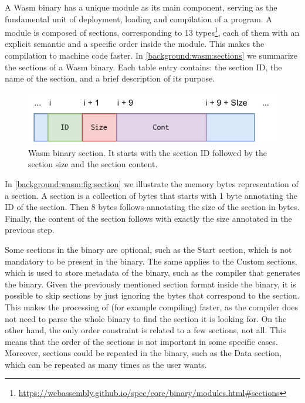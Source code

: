 A Wasm binary has a unique module as its main component, serving as the fundamental unit of deployment, loading and compilation of a \Wasm program.
A module is composed of sections, corresponding to 13 types\footnote{\url{https://webassembly.github.io/spec/core/binary/modules.html\#sections}}, each of them with an explicit semantic and a specific order inside the module. 
This makes the compilation to machine code faster. 
In \autoref{background:wasm:sections} we summarize the sections of a Wasm  binary.
Each table entry contains: the section ID, the name of the section, and a brief description of its purpose. 

\begin{figure}
    \centering
    \includegraphics[width=0.5\linewidth]{figures/section.pdf}
    \caption{Wasm binary section. It starts with the section ID followed by the section size and the section content.}
    \label{background:wasm:fig:section}
\end{figure}

In \autoref{background:wasm:fig:section} we illustrate the memory bytes representation of a \wasm section.
A \wasm section is a collection of bytes that starts with 1 byte annotating the ID of the section. 
Then 8 bytes follows annotating the size of the section in bytes. 
Finally, the content of the section follows with exactly the size annotated in the previous step.  

Some sections in the binary are optional, such as the Start section, which is not mandatory to be present in the binary.
The same applies to the Custom sections, which is used to store metadata of the binary, such as the compiler that generates the binary.
Given the previously mentioned section format inside the binary, it is possible to skip sections by just ignoring the bytes that correspond to the section.
This makes the processing of \wasm (for example compiling) faster, as the compiler does not need to parse the whole binary to find the section it is looking for.
On the other hand, the only order constraint is related to a few sections, not all. 
This means that the order of the sections is not important in some specific cases.
Moreover, sections could be repeated in the binary, such as the Data section, which can be repeated as many times as the user wants.


